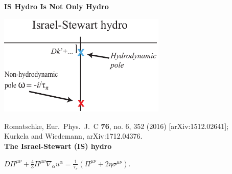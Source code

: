 \documentclass[9pt,a4paper,unknownkeysallowed,xcolor=dvipsnames,aspectratio=43]{beamer}
\begin{document}
\begin{frame}{\bf\huge IS Hydro Is Not Only Hydro}
\setcounter{page}{5}
\vspace{4mm}
\begin{center}
\includegraphics[width=0.6\textwidth]{fig/omega_IS}
\end{center}
{\tiny {\color{white} Romatschke,
  Eur.\ Phys.\ J.\ C {\bf 76}, no. 6, 352 (2016)
  [arXiv:1512.02641];\\Kurkela and Wiedemann,
  arXiv:1712.04376.
  }
  }\vspace{4mm}\\
{{\LARGE\bf\color{darkred} The Israel-Stewart (IS) hydro}}
\vspace{4mm}
\begin{center}
{$D\Pi^{\mu\nu}+\frac{4}{3}\Pi^{\mu\nu}\nabla_\alpha u^\alpha = \frac{1}{\tau_\pi}\left(\Pi^{\mu\nu}+2 \eta\sigma^{\mu\nu}\right).$}
\end{center}
 \end{frame}
%
%
%
\end{document}
